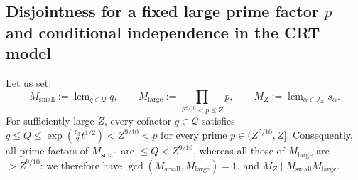 \documentclass[11pt, a4paper]{article}
\theoremstyle{plain}
\theoremstyle{definition}
\begin{document}
\subsection{Disjointness for a fixed large prime factor $p$ and conditional independence in the CRT model}\label{subsec:incompatibilite_CRT}
Let us set:
\begin{equation}\label{eq:def_moduli_CRT}
M_{\mathrm{small}} := \operatorname{lcm}_{q \in \mathcal{Q}} q, \qquad M_{\mathrm{large}} := \prod_{Z^{9/10} < p \le Z} p, \qquad M_Z := \operatorname{lcm}_{\alpha \in \mathcal{I}_Z} s_\alpha.
\end{equation}
For sufficiently large $Z$, every cofactor $q \in \mathcal{Q}$ satisfies $q \le Q \le \exp(\frac{c_3}{2} t^{1/2}) < Z^{9/10} < p$ for every prime $p \in (Z^{9/10}, Z]$. Consequently, all prime factors of $M_{\mathrm{small}}$ are $\le Q < Z^{9/10}$, whereas all those of $M_{\mathrm{large}}$ are $> Z^{9/10}$: we therefore have $\gcd(M_{\mathrm{small}}, M_{\mathrm{large}}) = 1$, and $M_Z \mid M_{\mathrm{small}} M_{\mathrm{large}}$.
\end{document}

